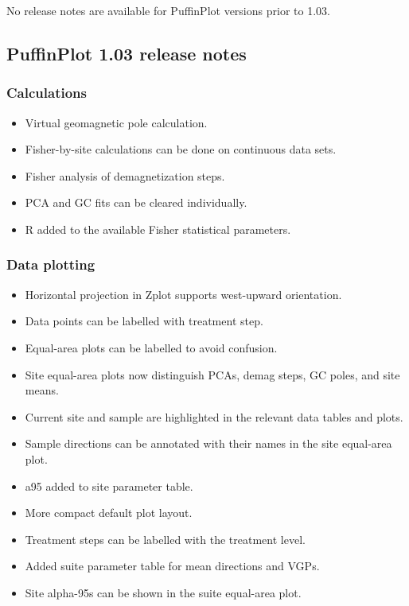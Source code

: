 \documentclass[a4paper,british]{article}
\begin{document}
No release notes are available for PuffinPlot versions prior to 1.03.

\subsection*{PuffinPlot 1.03 release notes}
\label{sec-1}
\subsubsection*{Calculations}
\label{sec-1-1}
\begin{itemize}
\item Virtual geomagnetic pole calculation.
\item Fisher-by-site calculations can be done on continuous data sets.
\item Fisher analysis of demagnetization steps.
\item PCA and GC fits can be cleared individually.
\item R added to the available Fisher statistical parameters.
\end{itemize}

\subsubsection*{Data plotting}
\label{sec-1-2}
\begin{itemize}
\item Horizontal projection in Zplot supports west-upward orientation.
\item Data points can be labelled with treatment step.
\item Equal-area plots can be labelled to avoid confusion.
\item Site equal-area plots now distinguish PCAs, demag steps, GC poles,
and site means.
\item Current site and sample are highlighted in the relevant data tables
and plots.
\item Sample directions can be annotated with their names in the site
equal-area plot.
\item a95 added to site parameter table.
\item More compact default plot layout.
\item Treatment steps can be labelled with the treatment level.
\item Added suite parameter table for mean directions and VGPs.
\item Site alpha-95s can be shown in the suite equal-area plot.
\end{itemize}
\end{document}
